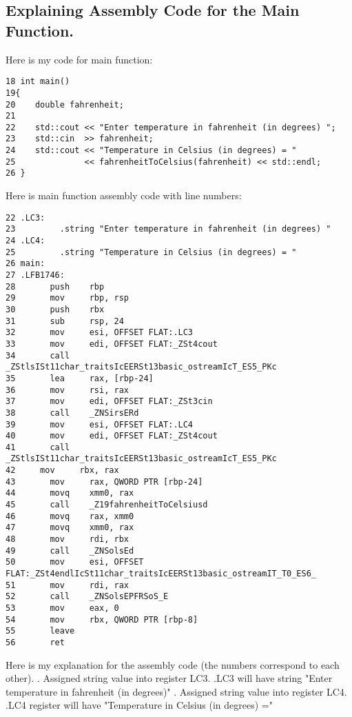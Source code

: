 \documentclass{article}
\theoremstyle{theorem}
\theoremstyle{definition}
\theoremstyle{remark}
\begin{document}
\subsection{Explaining Assembly Code for the Main Function.}
Here is my code for main function:
\begin{lstlisting}
18 int main()
19{
20    double fahrenheit; 
21
22    std::cout << "Enter temperature in fahrenheit (in degrees) ";
23    std::cin  >> fahrenheit;
24    std::cout << "Temperature in Celsius (in degrees) = "
25              << fahrenheitToCelsius(fahrenheit) << std::endl;
26 }
\end{lstlisting}
 Here is main function assembly code with line numbers:
\begin{lstlisting}
22 .LC3:
23         .string "Enter temperature in fahrenheit (in degrees) "
24 .LC4:
25         .string "Temperature in Celsius (in degrees) = "
26 main:
27 .LFB1746:
28       push    rbp
29       mov     rbp, rsp
30       push    rbx
31       sub     rsp, 24
32       mov     esi, OFFSET FLAT:.LC3
33       mov     edi, OFFSET FLAT:_ZSt4cout
34       call    _ZStlsISt11char_traitsIcEERSt13basic_ostreamIcT_ES5_PKc
35       lea     rax, [rbp-24]
36       mov     rsi, rax
37       mov     edi, OFFSET FLAT:_ZSt3cin
38       call    _ZNSirsERd
39       mov     esi, OFFSET FLAT:.LC4
40       mov     edi, OFFSET FLAT:_ZSt4cout
41       call    _ZStlsISt11char_traitsIcEERSt13basic_ostreamIcT_ES5_PKc
42	   mov     rbx, rax
43       mov     rax, QWORD PTR [rbp-24]
44       movq    xmm0, rax
45       call    _Z19fahrenheitToCelsiusd
46       movq    rax, xmm0
47       movq    xmm0, rax
48       mov     rdi, rbx
49       call    _ZNSolsEd
50       mov     esi, OFFSET FLAT:_ZSt4endlIcSt11char_traitsIcEERSt13basic_ostreamIT_T0_ES6_
51       mov     rdi, rax
52       call    _ZNSolsEPFRSoS_E
53       mov     eax, 0
54       mov     rbx, QWORD PTR [rbp-8]
55       leave
56       ret
\end{lstlisting}
Here is my explanation for the assembly code (the numbers correspond to each other).
\newline {}. Assigned string value into register LC3.
\newline .LC3 will have string "Enter temperature in fahrenheit (in degrees)"
\newline {}. Assigned string value into register LC4.
\newline .LC4 register will have "Temperature in Celsius (in degrees) ="
\end{document}
